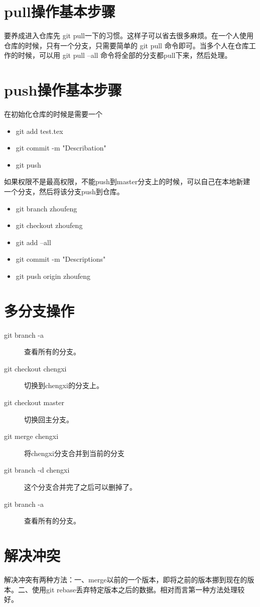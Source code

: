 \documentclass[a4paper,12pt]{ctexbook}
\begin{document}
\newpage
\section{pull操作基本步骤}
要养成进入仓库先 git pull一下的习惯。这样子可以省去很多麻烦。在一个人使用仓库的时候，只有一个分支，只需要简单的 git pull 命令即可。当多个人在仓库工作的时候，可以用 git pull --all 命令将全部的分支都pull下来，然后处理。

\newpage
\section{push操作基本步骤}
在初始化仓库的时候是需要一个
\begin{itemize}
   \item git add test.tex
   \item git commit -m "Describation"
   \item git push
\end{itemize}
如果权限不是最高权限，不能push到master分支上的时候，可以自己在本地新建一个分支，然后将该分支push到仓库。
\begin{itemize}
  \item git branch zhoufeng
  \item git checkout zhoufeng
  \item git add --all
  \item git commit -m "Descriptions"
  \item git push origin zhoufeng
\end{itemize}

\section{多分支操作}
\begin{description}
  \item[git branch -a]  查看所有的分支。
  \item[git checkout chengxi]   切换到chengxi的分支上。
  \item[git checkout master]    切换回主分支。
  \item[git merge chengxi]  将chengxi分支合并到当前的分支
  \item[git branch -d chengxi]  这个分支合并完了之后可以删掉了。
  \item[git branch -a]  查看所有的分支。
\end{description}

\section{解决冲突}
解决冲突有两种方法：一、merge以前的一个版本，即将之前的版本挪到现在的版本。二、使用git rebase丢弃特定版本之后的数据。相对而言第一种方法处理较好。
\end{document}
